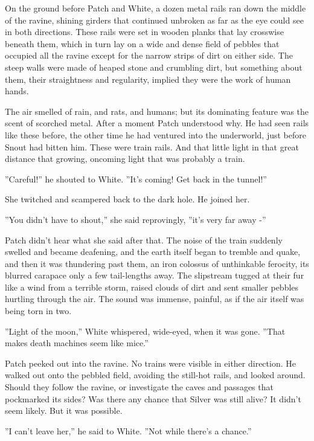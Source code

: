\documentclass[12pt]{book}
\begin{document}
On the ground before Patch and White, a dozen metal rails ran down the middle of the ravine, shining girders that continued unbroken as far as the eye could see in both directions. These rails were set in wooden planks that lay crosswise beneath them, which in turn lay on a wide and dense field of pebbles that occupied all the ravine except for the narrow strips of dirt on either side. The steep walls were made of heaped stone and crumbling dirt, but something about them, their straightness and regularity, implied they were the work of human hands.

The air smelled of rain, and rats, and humans; but its dominating feature was the scent of scorched metal. After a moment Patch understood why. He had seen rails like these before, the other time he had ventured into the underworld, just before Snout had bitten him. These were train rails. And that little light in that great distance %
that growing, oncoming light %
that was probably a train.

''Careful!'' he shouted to White. ''It's coming! Get back in the tunnel!''

She twitched and scampered back to the dark hole. He joined her.

''You didn't have to shout,'' she said reprovingly, ''it's very far away -''

Patch didn't hear what she said after that. The noise of the train suddenly swelled and became deafening, and the earth itself began to tremble and quake, and then it was thundering past them, an iron colossus of unthinkable ferocity, its blurred carapace only a few tail-lengths away. The slipstream tugged at their fur like a wind from a terrible storm, raised clouds of dirt and sent smaller pebbles hurtling through the air. The sound was immense, painful, as if the air itself was being torn in two.

''Light of the moon,'' White whispered, wide-eyed, when it was gone. ''That makes death machines seem like mice.''

Patch peeked out into the ravine. No trains were visible in either direction. He walked out onto the pebbled field, avoiding the still-hot rails, and looked around. Should they follow the ravine, or investigate the caves and passages that pockmarked its sides? Was there any chance that Silver was still alive? It didn't seem likely. But it was possible.

''I can't leave her,'' he said to White. ''Not while there's a chance.''
\end{document}
